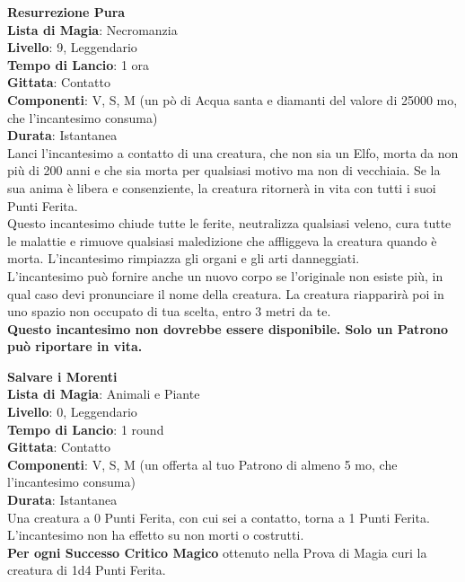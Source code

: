 \documentclass[a4paper,twoside,openany]{book}
\begin{document}
\begin{multicols}{2}
\medskip\textbf{Resurrezione Pura}\\
\textbf{Lista di Magia}: Necromanzia\\
\textbf{Livello}: 9, Leggendario\\
\textbf{Tempo di Lancio}: 1 ora\\
\textbf{Gittata}: Contatto\\
\textbf{Componenti}: V, S, M (un pò di Acqua santa e diamanti del valore di 25000 mo, che l'incantesimo consuma)\\
\textbf{Durata}: Istantanea\\
Lanci l'incantesimo a contatto di una creatura, che non sia un Elfo, morta da non più di 200 anni e che sia morta per qualsiasi motivo ma non di vecchiaia. Se la sua anima è libera e consenziente, la creatura ritornerà in vita con tutti i suoi Punti Ferita. \\
Questo incantesimo chiude tutte le ferite, neutralizza qualsiasi veleno, cura tutte le malattie e rimuove qualsiasi maledizione che affliggeva la creatura quando è morta. L'incantesimo rimpiazza gli organi e gli arti danneggiati.\\
L'incantesimo può fornire anche un nuovo corpo se l'originale non esiste più, in qual caso devi pronunciare il nome della creatura. La creatura riapparirà poi in uno spazio non occupato di tua scelta, entro 3 metri da te. \\
\textbf{Questo incantesimo non dovrebbe essere disponibile. Solo un Patrono può riportare in vita.}

\medskip\textbf{Salvare i Morenti}\\
\textbf{Lista di Magia}: Animali e Piante\\
\textbf{Livello}: 0, Leggendario\\
\textbf{Tempo di Lancio}: 1 round\\
\textbf{Gittata}: Contatto\\
\textbf{Componenti}: V, S, M (un offerta al tuo Patrono di almeno 5 mo, che l'incantesimo consuma)\\
\textbf{Durata}: Istantanea\\
Una creatura a 0 Punti Ferita, con cui sei a contatto, torna a 1 Punti Ferita. L'incantesimo non ha effetto su non morti o costrutti.\\
\textbf{Per ogni Successo Critico Magico} ottenuto nella Prova di Magia curi la creatura di 1d4 Punti Ferita.


\end{multicols}
\end{document}
